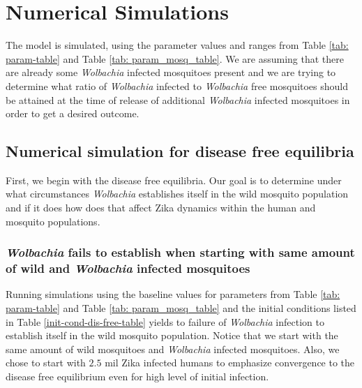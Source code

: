 \documentclass{ws-rv9x6}
\begin{document}
\section{Numerical Simulations}
\label{simulations}


The model is simulated, using the parameter values and ranges from Table \ref{tab: param-table} and Table \ref{tab: param_mosq_table}. We are assuming that there are already some \textit{Wolbachia} infected mosquitoes present and we are trying to determine what ratio of \textit{Wolbachia} infected to \textit{Wolbachia} free mosquitoes should be attained at the time of release of additional \textit{Wolbachia} infected mosquitoes in order to get a desired outcome.

\subsection{Numerical simulation for disease free equilibria}

First, we begin with the disease free equilibria.
Our goal is to determine under what circumstances \textit{Wolbachia} establishes itself in the wild mosquito population and if it does how does that affect Zika dynamics within the human and mosquito populations.

\subsubsection{\textit{Wolbachia} fails to establish when starting with same amount of wild and \textit{Wolbachia} infected mosquitoes}\label{diseasefreefirst} 

Running simulations using the baseline values for parameters from Table \ref{tab: param-table} and Table \ref{tab: param_mosq_table} and the initial conditions listed in Table \ref{init-cond-dis-free-table}  yields to failure of \textit{Wolbachia} infection to establish itself in the wild mosquito population. Notice that we start with the same amount of wild mosquitoes and \textit{Wolbachia} infected mosquitoes. Also, we chose to start with $2.5$ mil Zika infected humans to emphasize convergence to the disease free equilibrium even for high level of initial infection.
\end{document}
